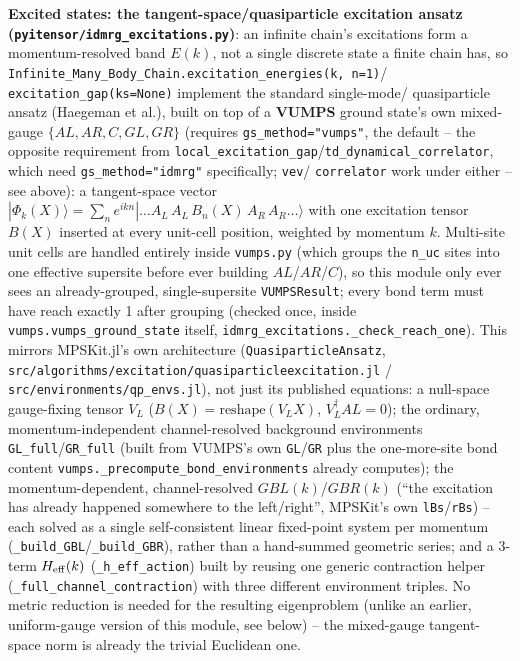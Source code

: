 \documentclass[11pt]{article}
\begin{document}
\textbf{Excited states: the tangent-space/quasiparticle excitation
ansatz (\texttt{pyitensor/idmrg\_excitations.py})}: an infinite chain's
excitations form a momentum-resolved band $E(k)$, not a single discrete
state a finite chain has, so
\texttt{Infinite\_Many\_Body\_Chain.excitation\_energies(k, n=1)}/
\texttt{excitation\_gap(ks=None)} implement the standard single-mode/
quasiparticle ansatz (Haegeman et al.), built on top of a \textbf{VUMPS}
ground state's own mixed-gauge $\{AL, AR, C, GL, GR\}$ (requires
\texttt{gs\_method="vumps"}, the default -- the opposite requirement
from \texttt{local\_excitation\_gap}/\texttt{td\_dynamical\_correlator},
which need \texttt{gs\_method="idmrg"} specifically; \texttt{vev}/
\texttt{correlator} work under either -- see above): a tangent-space vector
$|\Phi_k(X)\rangle = \sum_n e^{ikn} |\ldots A_L\,A_L\,B_n(X)\,A_R\,A_R\ldots\rangle$
with one excitation tensor $B(X)$ inserted at every unit-cell position,
weighted by momentum $k$. Multi-site unit cells are handled entirely
inside \texttt{vumps.py} (which groups the \texttt{n\_uc} sites into one
effective supersite before ever building $AL$/$AR$/$C$), so this module
only ever sees an already-grouped, single-supersite
\texttt{VUMPSResult}; every bond term must have reach exactly 1 after
grouping (checked once, inside \texttt{vumps.vumps\_ground\_state}
itself, \texttt{idmrg\_excitations.\_check\_reach\_one}). This mirrors
MPSKit.jl's own architecture (\texttt{QuasiparticleAnsatz},
\texttt{src/algorithms/excitation/quasiparticleexcitation.jl} /
\texttt{src/environments/qp\_envs.jl}), not just its published
equations: a null-space gauge-fixing tensor $V_L$
($B(X) = \mathrm{reshape}(V_L X)$, $V_L^\dagger AL = 0$); the ordinary,
momentum-independent channel-resolved background environments
\texttt{GL\_full}/\texttt{GR\_full} (built from VUMPS's own
\texttt{GL}/\texttt{GR} plus the one-more-site bond content
\texttt{vumps.\_precompute\_bond\_environments} already computes); the
momentum-dependent, channel-resolved $GBL(k)$/$GBR(k)$ (``the excitation
has already happened somewhere to the left/right'', MPSKit's own
\texttt{lBs}/\texttt{rBs}) -- each solved as a single self-consistent
linear fixed-point system per momentum
(\texttt{\_build\_GBL}/\texttt{\_build\_GBR}), rather than a hand-summed
geometric series; and a 3-term $H_{\rm eff}(k)$
(\texttt{\_h\_eff\_action}) built by reusing one generic contraction
helper (\texttt{\_full\_channel\_contraction}) with three different
environment triples. No metric reduction is needed for the resulting
eigenproblem (unlike an earlier, uniform-gauge version of this module,
see below) -- the mixed-gauge tangent-space norm is already the trivial
Euclidean one.
\end{document}
